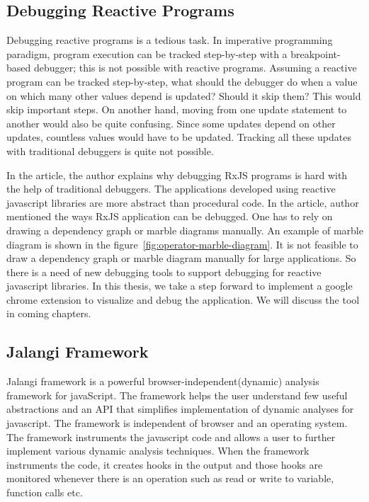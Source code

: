 \subsection{Debugging Reactive Programs}
Debugging reactive programs is a tedious task. In imperative programming paradigm, program execution can be tracked step-by-step with a breakpoint-based debugger; this is not possible with reactive programs. Assuming a reactive program can be tracked step-by-step, what should the debugger do when a value on which many other values depend is updated? Should it skip them? This would skip important steps. On another hand, moving from one update statement to another would also be quite confusing. Since some updates depend on other updates, countless values would have to be updated. Tracking all these updates with traditional debuggers is quite not possible.

In the article\cite{debugRxJS}, the author explains why debugging RxJS programs is hard with the help of traditional debuggers. The applications developed using reactive javascript libraries are more abstract than procedural code. In the article, author mentioned the ways RxJS application can be debugged. One has to rely on drawing a dependency graph or marble diagrams manually. An example of marble diagram is shown in the figure~\ref{fig:operator-marble-diagram}. It is not feasible to draw a dependency graph or marble diagram manually for large applications. So there is a need of new debugging tools to support debugging for reactive javascript libraries. In this thesis, we take a step forward to implement a google chrome extension to visualize and debug the application. We will discuss the tool in coming chapters.

\subsection{Jalangi Framework}
Jalangi framework\cite{Sen:2013:JSR:2491411.2491447} is a powerful    browser-independent(dynamic) analysis framework for javaScript. The framework helps the user understand few useful abstractions and an API that simplifies implementation of dynamic analyses for javascript. The framework is independent of browser and an operating system. The framework instruments the javascript code and allows a user to further implement various dynamic analysis techniques. When the framework instruments the code, it creates hooks in the output and those hooks are monitored whenever there is an operation such as read or write to variable, function calls etc.


